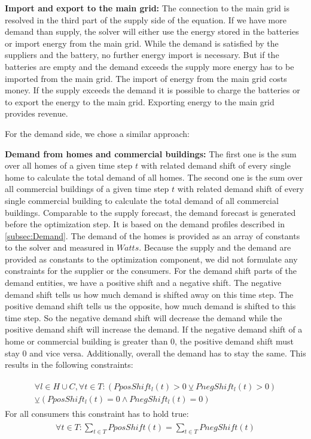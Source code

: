 \textbf{Import and export to the main grid:} The connection to the main grid is resolved in the third part of the supply side of the equation.
If we have more demand than supply, the solver will either use the energy stored in the batteries or import energy from the main grid. While the demand is satisfied by the suppliers and the battery, no further energy import is necessary. But if the batteries are empty and the demand exceeds the supply more energy has to be imported from the main grid. The import of energy from the main grid costs money. If the supply exceeds the demand it is possible to charge the batteries or to export the energy to the main grid. Exporting energy to the main grid provides revenue.

For the demand side, we chose a similar approach:

\textbf{Demand from homes and commercial buildings:} The first one is the sum over all homes of a given time step $t$ with related demand shift of every single home to calculate the total demand of all homes.
The second one is the sum over all commercial buildings of a given time step $t$ with related demand shift of every single commercial building to calculate the total demand of all commercial buildings.
Comparable to the supply forecast, the demand forecast is generated before the optimization step. 
It is based on the demand profiles described in \cref{subsec:Demand}. 
The demand of the homes is provided as an array of constants to the solver and measured in $Watts$. 
Because the supply and the demand are provided as constants to the optimization component, we did not formulate any constraints for the supplier or the consumers.
For the demand shift parts of the demand entities, we have a positive shift and a negative shift.
The negative demand shift tells us how much demand is shifted away on this time step.
The positive demand shift tells us the opposite, how much demand is shifted to this time step.
So the negative demand shift will decrease the demand while the positive demand shift will increase the demand.
If the negative demand shift of a home or commercial building is greater than 0, the positive demand shift must stay 0 and vice versa. Additionally, overall the demand has to stay the same. 
This results in the following constraints:

\begin{align} \label{eq:shift}
\begin{split}
\forall l \in H\cup C, \forall t \in T: (PposShift_{l}(t) > 0 \veebar PnegShift_{l}(t) > 0)\\ \veebar (PposShift_{l}(t) = 0 \wedge PnegShift_{l}(t) = 0)
\end{split}
\end{align}
For all consumers this constraint has to hold true:
\begin{align} \label{eq:shiftSum}
\begin{split}
\forall t \in T: \sum\limits_{t\in T} PposShift(t) = \sum\limits_{t\in T} PnegShift(t)\\
\end{split}
\end{align}


